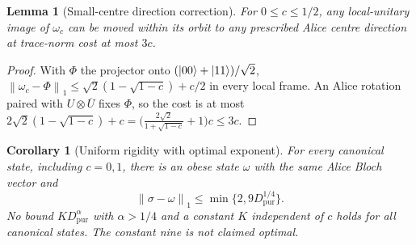 \documentclass[11pt]{article}
\newtheorem{lemma}[theorem]{Lemma}
\newtheorem{corollary}[theorem]{Corollary}
\theoremstyle{remark}\newtheorem{remark}[theorem]{Remark}
\newcommand{\norm}[1]{\left\lVert#1\right\rVert}
\newcommand{\Dp}{D_{\mathrm{pur}}}
\begin{document}
\begin{lemma}[Small-centre direction correction]\label{lem:small-centre}
For $0\le c\le1/2$, any local-unitary image of $\omega_c$ can be moved within
its orbit to any prescribed Alice centre direction at trace-norm cost at most
$3c$.
\end{lemma}
\begin{proof}
With $\Phi$ the projector onto $(|00\rangle+|11\rangle)/\sqrt2$,
$\norm{\omega_c-\Phi}_1\le\sqrt2(1-\sqrt{1-c})+c/2$ in every local frame. An
Alice rotation paired with $U\otimes\overline U$ fixes $\Phi$, so the cost is at
most $2\sqrt2(1-\sqrt{1-c})+c=\bigl(\tfrac{2\sqrt2}{1+\sqrt{1-c}}+1\bigr)c\le3c$.
\end{proof}

\begin{corollary}[Uniform rigidity with optimal exponent]\label{cor:uniform-rigidity}
For every canonical state, including $c=0,1$, there is an obese state $\omega$
with the same Alice Bloch vector and
\begin{equation}\label{eq:uniform-quarter}
 \norm{\sigma-\omega}_1\le\min\{2,9\Dp^{1/4}\}.
\end{equation}
No bound $K\Dp^{\alpha}$ with $\alpha>1/4$ and a constant $K$ independent of $c$
holds for all canonical states. The constant nine is not claimed optimal.
\end{corollary}
\end{document}

